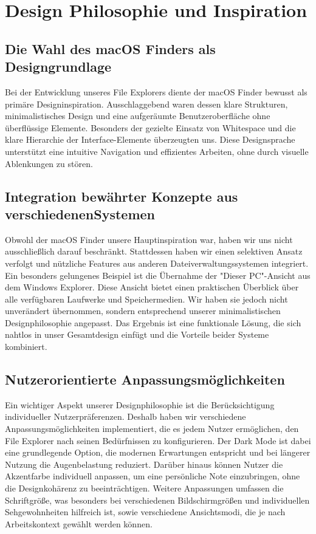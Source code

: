 \section{Design Philosophie und Inspiration}\label{sec:Design Philosophie und Inspiration} 

\subsection{Die Wahl des macOS Finders als Designgrundlage}
Bei der Entwicklung unseres File Explorers diente der macOS Finder bewusst als primäre Designinspiration. Ausschlaggebend waren dessen klare Strukturen, minimalistisches Design und eine aufgeräumte Benutzeroberfläche ohne überflüssige Elemente. Besonders der gezielte Einsatz von Whitespace und die klare Hierarchie der Interface-Elemente überzeugten uns. Diese Designsprache unterstützt eine intuitive Navigation und effizientes Arbeiten, ohne durch visuelle Ablenkungen zu stören.

\subsection{Integration bewährter Konzepte aus verschiedenenSystemen}
Obwohl der macOS Finder unsere Hauptinspiration war, haben wir uns nicht ausschließlich
darauf beschränkt. Stattdessen haben wir einen selektiven Ansatz verfolgt und nützliche
Features aus anderen Dateiverwaltungssystemen integriert. Ein besonders gelungenes Beispiel
ist die Übernahme der "Dieser PC"-Ansicht aus dem Windows Explorer.
Diese Ansicht bietet einen praktischen Überblick über alle verfügbaren Laufwerke und
Speichermedien. Wir haben sie jedoch nicht unverändert übernommen, sondern entsprechend
unserer minimalistischen Designphilosophie angepasst. Das Ergebnis ist eine funktionale
Lösung, die sich nahtlos in unser Gesamtdesign einfügt und die Vorteile beider Systeme
kombiniert.

\subsection{Nutzerorientierte Anpassungsmöglichkeiten}
Ein wichtiger Aspekt unserer Designphilosophie ist die Berücksichtigung individueller
Nutzerpräferenzen. Deshalb haben wir verschiedene Anpassungsmöglichkeiten
implementiert, die es jedem Nutzer ermöglichen, den File Explorer nach seinen Bedürfnissen
zu konfigurieren.
Der Dark Mode ist dabei eine grundlegende Option, die modernen Erwartungen entspricht
und bei längerer Nutzung die Augenbelastung reduziert. Darüber hinaus können Nutzer die
Akzentfarbe individuell anpassen, um eine persönliche Note einzubringen, ohne die
Designkohärenz zu beeinträchtigen.
Weitere Anpassungen umfassen die Schriftgröße, was besonders bei verschiedenen
Bildschirmgrößen und individuellen Sehgewohnheiten hilfreich ist, sowie verschiedene
Ansichtsmodi, die je nach Arbeitskontext gewählt werden können.

